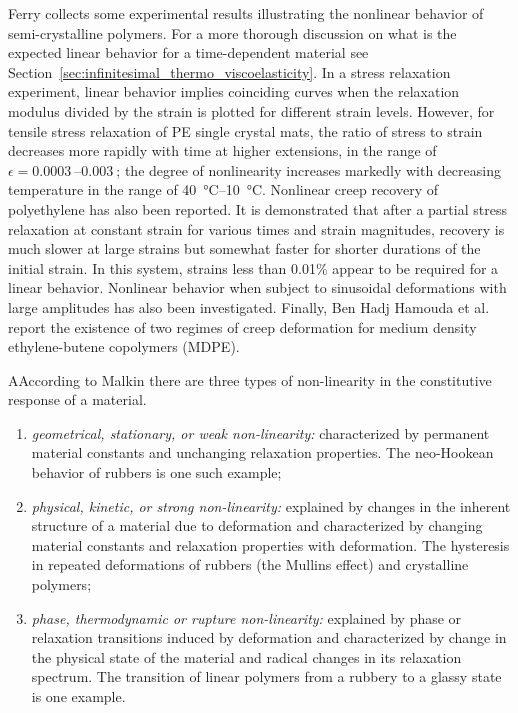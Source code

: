Ferry \citep{ferryViscoelasticPropertiesPolymers1980} collects some experimental results illustrating the nonlinear behavior of semi-crystalline polymers.
For a more thorough discussion on what is the expected linear behavior for a time-dependent material see Section~\ref{sec:infinitesimal_thermo_viscoelasticity}.
In a stress relaxation experiment, linear behavior implies coinciding curves when the relaxation modulus divided by the strain is plotted for different strain levels.
However, for tensile stress relaxation of PE single crystal mats, the ratio of stress to strain decreases more rapidly with time at higher extensions, in the range of $\epsilon = \SIrange{0.0003}{0.003}{}$; the degree of nonlinearity increases markedly with decreasing temperature in the range of \SIrange{40}{10}{\celsius}.
Nonlinear creep recovery of polyethylene has also been reported.
It is demonstrated that after a partial stress relaxation at constant strain for various times and strain magnitudes, recovery is much slower at large strains but somewhat faster for shorter durations of the initial strain.
In this system, strains less than 0.01\% appear to be required for a linear behavior.
Nonlinear behavior when subject to sinusoidal deformations with large amplitudes has also been investigated.
Finally, Ben Hadj Hamouda et al. \citep{benhadjhamoudaViscoplasticBehaviourMedium2007} report the existence of two regimes of creep deformation for medium density ethylene-butene copolymers (MDPE).

\begin{remark}
    AAccording to Malkin \citep{malkinNonlinearityRheologyEssay1995} there are three types of non-linearity in the constitutive response of a material.
    \begin{enumerate}
        \item \textit{geometrical, stationary, or weak non-linearity:} characterized by permanent material constants and unchanging relaxation properties. The neo-Hookean behavior of rubbers is one such example;
        \item \textit{physical, kinetic, or strong non-linearity:} explained by changes in the inherent structure of a material due to deformation and characterized by changing material constants and relaxation properties with deformation. The hysteresis in repeated deformations of rubbers (the Mullins effect) and crystalline polymers;
        \item \textit{phase, thermodynamic or rupture non-linearity:} explained by phase or relaxation transitions induced by deformation and characterized by change in the physical state of the material and radical changes in its relaxation spectrum. The transition of linear polymers from a rubbery to a glassy state is one example.
    \end{enumerate}
\end{remark}

